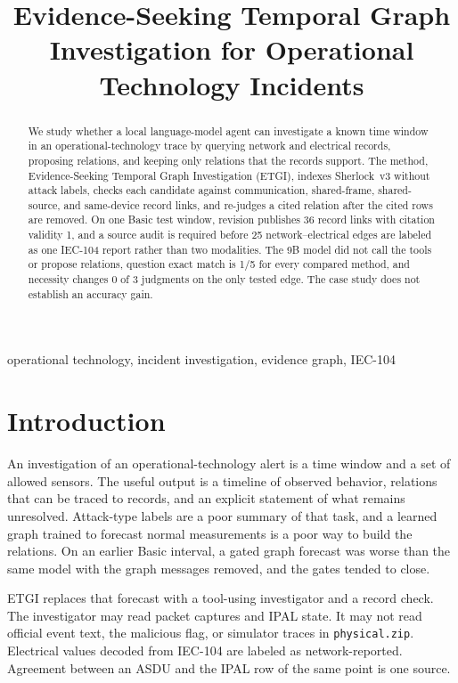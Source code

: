 \documentclass[conference]{IEEEtran}
\title{Evidence-Seeking Temporal Graph Investigation for Operational Technology Incidents}
\author{\IEEEauthorblockN{Manuscript draft}}
\begin{document}
\maketitle

\begin{abstract}
We study whether a local language-model agent can investigate a known time window in an operational-technology trace by querying network and electrical records, proposing relations, and keeping only relations that the records support.
The method, Evidence-Seeking Temporal Graph Investigation (ETGI), indexes Sherlock~v3 without attack labels, checks each candidate against communication, shared-frame, shared-source, and same-device record links, and re-judges a cited relation after the cited rows are removed.
On one Basic test window, revision publishes 36 record links with citation validity 1, and a source audit is required before 25 network--electrical edges are labeled as one IEC-104 report rather than two modalities.
The 9B model did not call the tools or propose relations, question exact match is 1/5 for every compared method, and necessity changes 0 of 3 judgments on the only tested edge.
The case study does not establish an accuracy gain.
\end{abstract}

\begin{IEEEkeywords}
operational technology, incident investigation, evidence graph, IEC-104
\end{IEEEkeywords}

\section{Introduction}
An investigation of an operational-technology alert is a time window and a set of allowed sensors.
The useful output is a timeline of observed behavior, relations that can be traced to records, and an explicit statement of what remains unresolved.
Attack-type labels are a poor summary of that task, and a learned graph trained to forecast normal measurements is a poor way to build the relations.
On an earlier Basic interval, a gated graph forecast was worse than the same model with the graph messages removed, and the gates tended to close.

ETGI replaces that forecast with a tool-using investigator and a record check.
The investigator may read packet captures and IPAL state.
It may not read official event text, the malicious flag, or simulator traces in \texttt{physical.zip}.
Electrical values decoded from IEC-104 are labeled as network-reported.
Agreement between an ASDU and the IPAL row of the same point is one source.
\end{document}
